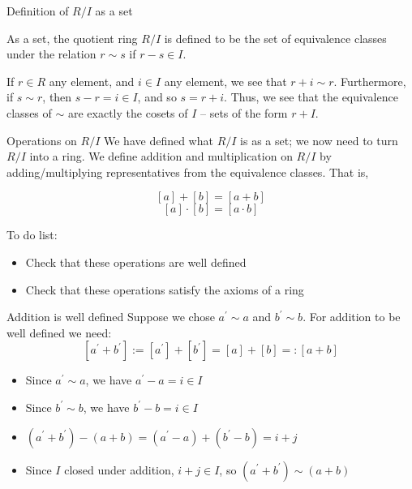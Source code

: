 \documentclass{beamer}
\begin{document}
\begin{frame}{Definition of $R/I$ as a set}

As a set, the quotient ring $R/I$ is defined to be the set of equivalence classes under the relation $r\sim s$ if $r-s\in I$.

If $r\in R$ any element, and $i\in I$ any element, we see that $r+i\sim r$.  Furthermore, if $s\sim r$, then $s-r=i\in I$, and so $s=r+i$.  Thus, we see that the equivalence classes of $\sim$ are exactly the cosets of $I$ -- sets of the form $r+I$.


\end{frame}


\begin{frame}{Operations on $R/I$}
We have defined what $R/I$ is as a set; we now need to turn $R/I$ into a ring.  We define addition and multiplication on $R/I$ by adding/multiplying representatives from the equivalence classes.  That is, 

$$[a]+[b]=[a+b]$$
$$[a]\cdot [b]=[a\cdot b]$$

\begin{block}{To do list:}
\begin{itemize}
\item Check that these operations are well defined
\item Check that these operations satisfy the axioms of a ring
\end{itemize}
\end{block}

\end{frame}

\begin{frame}{Addition is well defined}
Suppose we chose $a^\prime\sim a$ and $b^\prime \sim b$.  For addition to be well defined we need:
$$[a^\prime+b^\prime]:=[a^\prime]+[b^\prime]=[a]+[b]=:[a+b]$$

\begin{itemize}
\item Since $a^\prime \sim a$, we have $a^\prime-a=i\in I$
\item Since $b^\prime \sim b$, we have $b^\prime-b=i\in I$ 
\item $(a^\prime+b^\prime)-(a+b)=(a^\prime-a)+(b^\prime-b)=i+j$
\item Since $I$ closed under addition, $i+j\in I$, so $(a^\prime+b^\prime)\sim (a+b)$
\end{itemize}

\end{frame}
\end{document}
